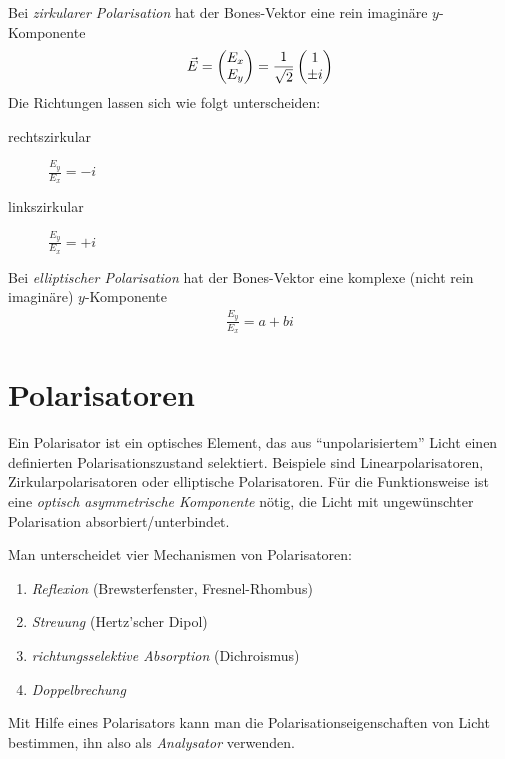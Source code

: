 Bei \emph{zirkularer Polarisation}
hat der Bones-Vektor eine rein imaginäre
$y$-Komponente
\begin{gather*}
  \vec{E} = \begin{pmatrix}E_x\\E_y\end{pmatrix} 
  = \frac{1}{\sqrt{2}}\begin{pmatrix}1\\\pm i\end{pmatrix}
\end{gather*}
Die Richtungen lassen sich wie folgt unterscheiden:
\begin{description}
\item[rechtszirkular] $\frac{E_y}{E_x}=-i$
\item[linkszirkular] $\frac{E_y}{E_x}=+i$
\end{description}

Bei \emph{elliptischer Polarisation}
hat der Bones-Vektor eine komplexe (nicht rein imaginäre)
$y$-Komponente
\begin{gather*}
  \frac{E_y}{E_x} = a+bi
\end{gather*}


\section{Polarisatoren}
Ein Polarisator ist ein optisches Element,
das aus \enquote{unpolarisiertem} Licht einen definierten
Polarisationszustand selektiert.
Beispiele sind Linearpolarisatoren, Zirkularpolarisatoren oder
elliptische Polarisatoren.
Für die Funktionsweise ist eine \emph{optisch asymmetrische
  Komponente} nötig,
die Licht mit ungewünschter Polarisation absorbiert/unterbindet.

Man unterscheidet vier Mechanismen von Polarisatoren:
\begin{enumerate}
\item \emph{Reflexion} (Brewsterfenster, Fresnel-Rhombus)
\item \emph{Streuung} (Hertz'scher Dipol)
\item \emph{richtungsselektive Absorption} (Dichroismus)
\item \emph{Doppelbrechung}
\end{enumerate}

Mit Hilfe eines Polarisators kann man die Polarisationseigenschaften
von Licht bestimmen, ihn also als \emph{Analysator}
verwenden.

